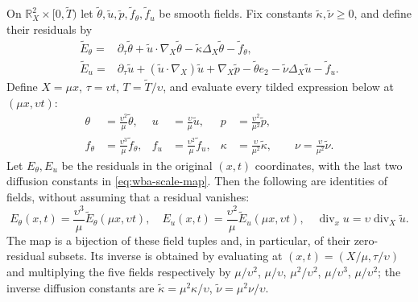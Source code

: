 On $\mathbb R_X^2\times[0,\widetilde T)$ let
$\widetilde\theta,\widetilde u,\widetilde p,
\widetilde f_\theta,\widetilde f_u$ be smooth fields. Fix constants
$\widetilde\kappa,\widetilde\nu\geq0$, and define their residuals by
\begin{align}
 \widetilde E_\theta={}&\partial_\tau\widetilde\theta+
 \widetilde u\cdot\nabla_X\widetilde\theta
 -\widetilde\kappa\Delta_X\widetilde\theta-\widetilde f_\theta,\\
 \widetilde E_u={}&\partial_\tau\widetilde u+
 (\widetilde u\cdot\nabla_X)\widetilde u+
 \nabla_X\widetilde p-\widetilde\theta e_2
 -\widetilde\nu\Delta_X\widetilde u-\widetilde f_u.
\end{align}
Define $X=\mu x$, $\tau=\upsilon t$, $T=\widetilde T/\upsilon$, and
evaluate every tilded expression below at $(\mu x,\upsilon t)$:
\begin{align}\label{eq:wba-scale-map}
 \theta&=\frac{\upsilon^2}{\mu}\widetilde\theta,&
 u&=\frac{\upsilon}{\mu}\widetilde u,&
 p&=\frac{\upsilon^2}{\mu^2}\widetilde p,\\
 f_\theta&=\frac{\upsilon^3}{\mu}\widetilde f_\theta,&
 f_u&=\frac{\upsilon^2}{\mu}\widetilde f_u,&
 \kappa&=\frac{\upsilon}{\mu^2}\widetilde\kappa,
 \qquad\nu=\frac{\upsilon}{\mu^2}\widetilde\nu.
\end{align}
Let $E_\theta,E_u$ be the residuals in the original $(x,t)$ coordinates,
with the last two diffusion constants in \eqref{eq:wba-scale-map}.
Then the following are identities of fields, without assuming that a residual
vanishes:
\begin{equation}\label{eq:wba-residual-intertwining}
 E_\theta(x,t)=\frac{\upsilon^3}{\mu}
 \widetilde E_\theta(\mu x,\upsilon t),\quad
 E_u(x,t)=\frac{\upsilon^2}{\mu}
 \widetilde E_u(\mu x,\upsilon t),\quad
 \operatorname{div}_x u=\upsilon\operatorname{div}_X\widetilde u.
\end{equation}
The map is a bijection of these field tuples and, in particular, of their
zero-residual subsets. Its inverse is obtained by evaluating at
$(x,t)=(X/\mu,\tau/\upsilon)$ and multiplying the five fields respectively
by $\mu/\upsilon^2$, $\mu/\upsilon$, $\mu^2/\upsilon^2$,
$\mu/\upsilon^3$, $\mu/\upsilon^2$; the inverse diffusion constants are
$\widetilde\kappa=\mu^2\kappa/\upsilon$,
$\widetilde\nu=\mu^2\nu/\upsilon$.

